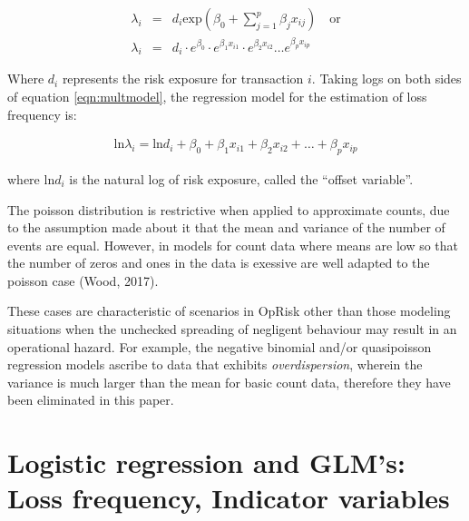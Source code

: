 \documentclass{DissertateUSU}
\begin{document}
\singlespacing

\begin{eqnarray}\label{eqn:multmodel}
\lambda_i &=& d_i\mbox{exp}(\beta_0 + \sum_{j=1}^{p}\beta_jx_{ij}) \quad \mbox{or} \nonumber \\
\lambda_i &=& d_i\cdot e^{\beta_0}\cdot e^{\beta_1x_{i1}}\cdot e^{\beta_2x_{i2}} \ldots e^{\beta_px_{ip}}
\end{eqnarray} \doublespacing

Where \(d_i\) represents the risk exposure for transaction \(i\). Taking
logs on both sides of equation \ref{eqn:multmodel}, the regression model
for the estimation of loss frequency is:

\singlespacing

\begin{eqnarray}
\mbox{ln}\lambda_i =  \mbox{ln}d_i + \beta_0 + \beta_1x_{i1} + \beta_2x_{i2} + \ldots + \beta_px_{ip}
\end{eqnarray} \doublespacing

where \(\mbox{ln}d_i\) is the natural log of risk exposure, called the
``offset variable''.\medskip

The poisson distribution is restrictive when applied to approximate
counts, due to the assumption made about it that the mean and variance
of the number of events are equal. However, in models for count data
where means are low so that the number of zeros and ones in the data is
exessive are well adapted to the poisson case (Wood, 2017).\medskip

These cases are characteristic of scenarios in OpRisk other than those
modeling situations when the unchecked spreading of negligent behaviour
may result in an operational hazard. For example, the negative binomial
and/or quasipoisson regression models ascribe to data that exhibits
\emph{overdispersion}, wherein the variance is much larger than the mean
for basic count data, therefore they have been eliminated in this paper.

\section{Logistic regression and GLM's: Loss frequency, Indicator variables}
\label{sec:Logistic regression and regression GLM's: Loss frequency, Indicator variables}
\end{document}
